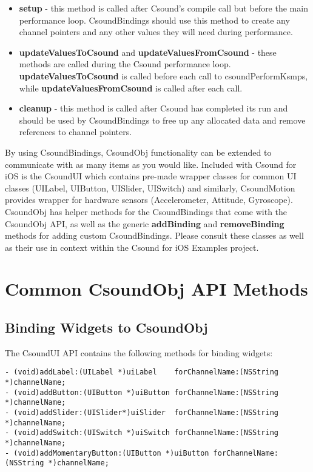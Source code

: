 \documentclass[11pt]{article}
\begin{document}
\begin{itemize}
\item \textbf{setup} - this method is called after Csound's compile call but before the main performance loop. CsoundBindings should use this method to create any channel pointers and any other values they will need during performance.
\item \textbf{updateValuesToCsound} and \textbf{updateValuesFromCsound} - these methods are called during the Csound performance loop. \textbf{updateValuesToCsound} is called before each call to csoundPerformKsmps, while \textbf{updateValuesFromCsound} is called after each call.
\item \textbf{cleanup} - this method is called after Csound has completed its run and should be used by CsoundBindings to free up any allocated data and remove references to channel pointers.
\end{itemize}

By using CsoundBindings, CsoundObj functionality can be extended to communicate with as many items as you would like. Included with Csound for iOS is the CsoundUI which contains pre-made wrapper classes for common UI classes (UILabel, UIButton, UISlider, UISwitch) and similarly, CsoundMotion provides wrapper for hardware sensors (Accelerometer, Attitude, Gyroscope).  CsoundObj has helper methods for the CsoundBindings that come with the CsoundObj API, as well as the generic \textbf{addBinding} and \textbf{removeBinding} methods for adding custom CsoundBindings. Please consult these classes as well as their use in context within the Csound for iOS Examples project.



\section{Common CsoundObj API Methods}

\subsection{Binding Widgets to CsoundObj}

The CsoundUI API contains the following methods for binding widgets:

\begin{lstlisting}[caption=Methods for Widget Binding]
- (void)addLabel:(UILabel *)uiLabel    forChannelName:(NSString *)channelName;
- (void)addButton:(UIButton *)uiButton forChannelName:(NSString *)channelName;
- (void)addSlider:(UISlider*)uiSlider  forChannelName:(NSString *)channelName;
- (void)addSwitch:(UISwitch *)uiSwitch forChannelName:(NSString *)channelName;
- (void)addMomentaryButton:(UIButton *)uiButton forChannelName:(NSString *)channelName;

\end{lstlisting}
\end{document}
